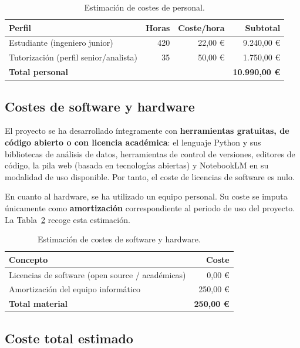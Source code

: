 \begin{table}[ht]
\centering
\small
\begin{tabular}{|l|r|r|r|}
\hline
\textbf{Perfil} & \textbf{Horas} & \textbf{Coste/hora} & \textbf{Subtotal} \\
\hline
Estudiante (ingeniero junior) & 420 & 22,00 € & 9.240,00 € \\
\hline
Tutorización (perfil senior/analista) & 35 & 50,00 € & 1.750,00 € \\
\hline
\multicolumn{3}{|l|}{\textbf{Total personal}} & \textbf{10.990,00 €} \\
\hline
\end{tabular}
\caption{Estimación de costes de personal.}
\label{tab:coste_personal}
\end{table}

\subsection{Costes de software y hardware}
\label{sec:plan_material}

El proyecto se ha desarrollado íntegramente con \textbf{herramientas gratuitas, de código abierto o con licencia académica}: el lenguaje Python y sus bibliotecas de análisis de datos, herramientas de control de versiones, editores de código, la pila web (basada en tecnologías abiertas) y NotebookLM en su modalidad de uso disponible. Por tanto, el coste de licencias de software es nulo.

En cuanto al hardware, se ha utilizado un equipo personal. Su coste se imputa únicamente como \textbf{amortización} correspondiente al periodo de uso del proyecto. La Tabla~\ref{tab:coste_material} recoge esta estimación.

\begin{table}[ht]
\centering
\small
\begin{tabular}{|l|r|}
\hline
\textbf{Concepto} & \textbf{Coste} \\
\hline
Licencias de software (open source / académicas) & 0,00 € \\
\hline
Amortización del equipo informático & 250,00 € \\
\hline
\textbf{Total material} & \textbf{250,00 €} \\
\hline
\end{tabular}
\caption{Estimación de costes de software y hardware.}
\label{tab:coste_material}
\end{table}

\subsection{Coste total estimado}
\label{sec:plan_total}

